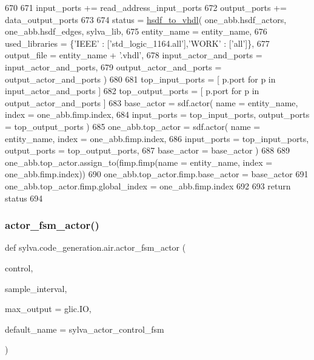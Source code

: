 \begin{DoxyCode}
670 
671     input\_ports += read\_address\_input\_ports
672     output\_ports += data\_output\_ports
673 
674   status = \hyperlink{namespacesylva_1_1code__generation_1_1hsdf__to__vhdl_a0725288caa57a5c518a1b9c2683291fa}{hsdf\_to\_vhdl}( one\_abb.hsdf\_actors, one\_abb.hsdf\_edges, sylva\_lib,
675     entity\_name = entity\_name,
676     used\_libraries = \{\textcolor{stringliteral}{'IEEE'} : [\textcolor{stringliteral}{'std\_logic\_1164.all'}],\textcolor{stringliteral}{'WORK'} : [\textcolor{stringliteral}{'all'}]\},
677     output\_file = entity\_name + \textcolor{stringliteral}{'.vhdl'},
678     input\_actor\_and\_ports = input\_actor\_and\_ports,
679     output\_actor\_and\_ports = output\_actor\_and\_ports )
680 
681   top\_input\_ports = [ p.port \textcolor{keywordflow}{for} p \textcolor{keywordflow}{in} input\_actor\_and\_ports ]
682   top\_output\_ports = [ p.port \textcolor{keywordflow}{for} p \textcolor{keywordflow}{in} output\_actor\_and\_ports ]
683   base\_actor = sdf.actor( name = entity\_name, index = one\_abb.fimp.index,
684     input\_ports = top\_input\_ports, output\_ports = top\_output\_ports )
685   one\_abb.top\_actor = sdf.actor( name = entity\_name, index = one\_abb.fimp.index,
686     input\_ports = top\_input\_ports, output\_ports = top\_output\_ports,
687     base\_actor = base\_actor )
688 
689   one\_abb.top\_actor.assign\_to(fimp.fimp(name = entity\_name, index = one\_abb.fimp.index))
690   one\_abb.top\_actor.fimp.base\_actor = base\_actor
691   one\_abb.top\_actor.fimp.global\_index = one\_abb.fimp.index
692 
693   \textcolor{keywordflow}{return} status
694 
\end{DoxyCode}
\mbox{\label{namespacesylva_1_1code__generation_1_1air_a29263a2d50cecb3cf4e5aa3b684c4666}} 
\subsubsection{\texorpdfstring{actor\+\_\+fsm\+\_\+actor()}{actor\_fsm\_actor()}}
{\footnotesize\ttfamily def sylva.\+code\+\_\+generation.\+air.\+actor\+\_\+fsm\+\_\+actor (\begin{DoxyParamCaption}\item[{}]{control,  }\item[{}]{sample\+\_\+interval,  }\item[{}]{max\+\_\+output = {\ttfamily glic.IO},  }\item[{}]{default\+\_\+name = {\ttfamily \textquotesingle{}sylva\+\_\+actor\+\_\+control\+\_\+fsm\textquotesingle{}} }\end{DoxyParamCaption})}



